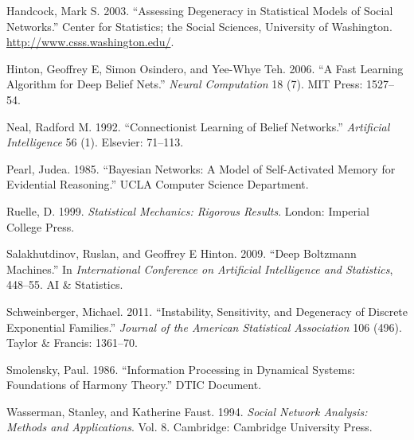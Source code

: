 \documentclass[12pt]{article}
\theoremstyle{definition}
\begin{document}
\hypertarget{ref-handcock2003assessing}{}
Handcock, Mark S. 2003. ``Assessing Degeneracy in Statistical Models of
Social Networks.'' Center for Statistics; the Social Sciences,
University of Washington. \url{http://www.csss.washington.edu/}.

\hypertarget{ref-hinton2006fast}{}
Hinton, Geoffrey E, Simon Osindero, and Yee-Whye Teh. 2006. ``A Fast
Learning Algorithm for Deep Belief Nets.'' \emph{Neural Computation} 18
(7). MIT Press: 1527--54.

\hypertarget{ref-neal1992connectionist}{}
Neal, Radford M. 1992. ``Connectionist Learning of Belief Networks.''
\emph{Artificial Intelligence} 56 (1). Elsevier: 71--113.

\hypertarget{ref-pearl985bayesian}{}
Pearl, Judea. 1985. ``Bayesian Networks: A Model of Self-Activated
Memory for Evidential Reasoning.'' UCLA Computer Science Department.

\hypertarget{ref-ruelle1999statistical}{}
Ruelle, D. 1999. \emph{Statistical Mechanics: Rigorous Results}. London:
Imperial College Press.

\hypertarget{ref-salakhutdinov2009deep}{}
Salakhutdinov, Ruslan, and Geoffrey E Hinton. 2009. ``Deep Boltzmann
Machines.'' In \emph{International Conference on Artificial Intelligence
and Statistics}, 448--55. AI \& Statistics.

\hypertarget{ref-schweinberger2011instability}{}
Schweinberger, Michael. 2011. ``Instability, Sensitivity, and Degeneracy
of Discrete Exponential Families.'' \emph{Journal of the American
Statistical Association} 106 (496). Taylor \& Francis: 1361--70.

\hypertarget{ref-smolensky1986information}{}
Smolensky, Paul. 1986. ``Information Processing in Dynamical Systems:
Foundations of Harmony Theory.'' DTIC Document.

\hypertarget{ref-wasserman1994social}{}
Wasserman, Stanley, and Katherine Faust. 1994. \emph{Social Network
Analysis: Methods and Applications}. Vol. 8. Cambridge: Cambridge
University Press.
\end{document}

